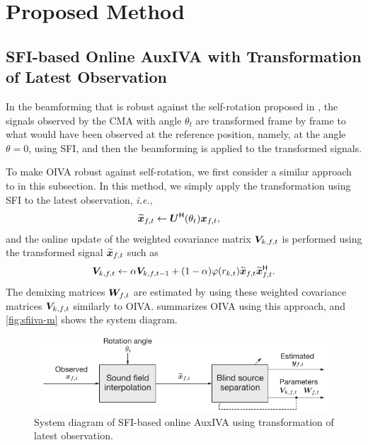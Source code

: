 \documentclass[sip,biber]{now-journal}
\begin{document}
\section{Proposed Method}\label{sec:proposed}


\subsection{SFI-based Online AuxIVA with Transformation of Latest Observation}

In the beamforming that is robust against the self-rotation proposed in \cite{Wakabayashi:2023:ASLP},
the signals observed by the CMA with angle $\theta_t$ are transformed frame by frame to what would have been observed at the reference position,
namely, at the angle $\theta=0$, using SFI, and then the beamforming is applied to the transformed signals.

To make OIVA robust against self-rotation, we first consider a similar approach to \cite{Wakabayashi:2023:ASLP} in this subsection.
In this method, we simply apply the transformation using SFI to the latest observation, \emph{i.e.},
\begin{align}
  \refpos{\Obs} _{\ft} &\gets \rotMat ^{\hermite} (\rotSpat _{\tframe}) \Obs _{\ft},
  \label{eq:sfi:obs}
\end{align}
and the online update of the weighted covariance matrix $\cov _{\src,\ft}$ is performed using the transformed signal $\refpos{\Obs} _{\ft}$ such as
\begin{align}
  \cov _{\src,\ft}\gets \forget \cov _{\src,\ft[-1]} + (1 - \forget) \weight(\var _{\src,\tframe}) \refpos{\Obs} _{\ft} \refpos{\Obs} _{\ft} ^{\hermite}.
  \label{eq:cov:rot}
\end{align}
The demixing matrices $\Demix _{\ft}$ are estimated by using these weighted covariance matrices $\cov _{\src,\ft}$ similarly to OIVA.
 summarizes OIVA using this approach, and \cref{fig:sfiiva-m} shows the system diagram.
\begin{figure}[t]
  \centering
  \includegraphics{figures/diagrams/sfiiva-o.pdf}%
  \caption{System diagram of SFI-based online AuxIVA using transformation of latest observation.}
  \label{fig:sfiiva-o}
\end{figure}
\end{document}
